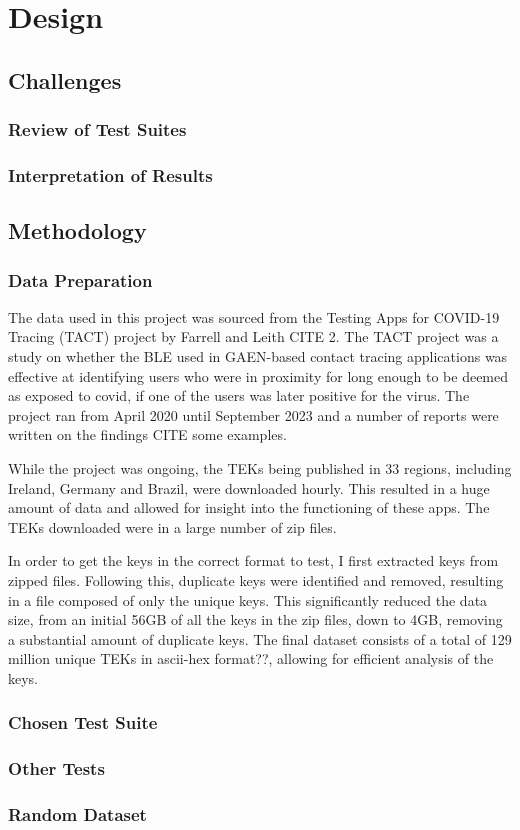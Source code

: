 \chapter{Design}

\section{Challenges}
\subsection{Review of Test Suites}
\subsection{Interpretation of Results}

\section{Methodology}
\subsection{Data Preparation}

The data used in this project was sourced from the Testing Apps for COVID-19 Tracing (TACT) project by Farrell and Leith CITE 2. The TACT project was a study on whether the BLE used in GAEN-based contact tracing applications was effective at identifying users who were in proximity for long enough to be deemed as exposed to covid, if one of the users was later positive for the virus. The project ran from April 2020 until September 2023 and a number of reports were written on the findings CITE some examples. \newline

While the project was ongoing, the TEKs being published in 33 regions, including Ireland, Germany and Brazil, were downloaded hourly. This resulted in a huge amount of data and allowed for insight into the functioning of these apps. The TEKs downloaded were in a large number of zip files. \newline

In order to get the keys in the correct format to test, I first extracted keys from zipped files. Following this, duplicate keys were identified and removed, resulting in a file composed  of only the unique keys. This significantly reduced the data size, from an initial 56GB of all the keys in the zip files, down to 4GB, removing a substantial amount of duplicate keys. The final dataset consists of a total of 129 million unique TEKs in ascii-hex format??, allowing for efficient analysis of the keys.

\subsection{Chosen Test Suite}
\subsection{Other Tests}
\subsection{Random Dataset}